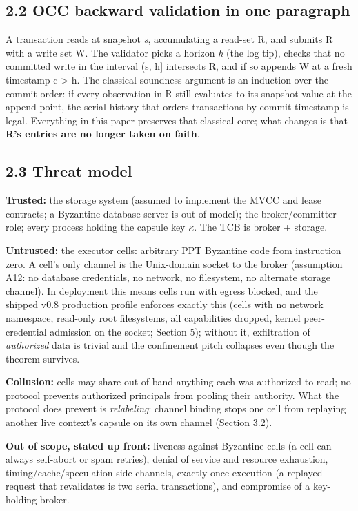 \documentclass[
  11pt,
]{article}
\begin{document}
\subsection{2.2 OCC backward validation in one paragraph}\label{occ-backward-validation-in-one-paragraph}

A transaction reads at snapshot \emph{s}, accumulating a read-set R, and submits R with a write set W. The validator picks a horizon \emph{h} (the log tip), checks that no committed write in the interval (s, h{]} intersects R, and if so appends W at a fresh timestamp c \textgreater{} h. The classical soundness argument is an induction over the commit order: if every observation in R still evaluates to its snapshot value at the append point, the serial history that orders transactions by commit timestamp is legal. Everything in this paper preserves that classical core; what changes is that \textbf{R's entries are no longer taken on faith}.

\subsection{2.3 Threat model}\label{threat-model}

\textbf{Trusted:} the storage system (assumed to implement the MVCC and lease contracts; a Byzantine database server is out of model); the broker/committer role; every process holding the capsule key $\kappa$. The TCB is broker + storage.

\textbf{Untrusted:} the executor cells: arbitrary PPT Byzantine code from instruction zero. A cell's only channel is the Unix-domain socket to the broker (assumption A12: no database credentials, no network, no filesystem, no alternate storage channel). In deployment this means cells run with egress blocked, and the shipped v0.8 production profile enforces exactly this (cells with no network namespace, read-only root filesystems, all capabilities dropped, kernel peer-credential admission on the socket; Section 5); without it, exfiltration of \emph{authorized} data is trivial and the confinement pitch collapses even though the theorem survives.

\textbf{Collusion:} cells may share out of band anything each was authorized to read; no protocol prevents authorized principals from pooling their authority. What the protocol does prevent is \emph{relabeling}: channel binding stops one cell from replaying another live context's capsule on its own channel (Section 3.2).

\textbf{Out of scope, stated up front:} liveness against Byzantine cells (a cell can always self-abort or spam retries), denial of service and resource exhaustion, timing/cache/speculation side channels, exactly-once execution (a replayed request that revalidates is two serial transactions), and compromise of a key-holding broker.
\end{document}
